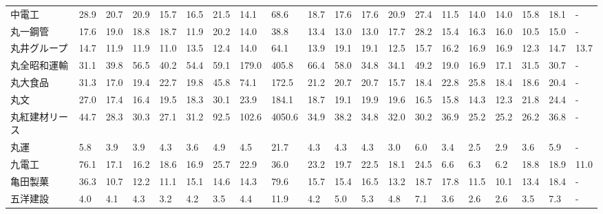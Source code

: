 \begin{tabular}{llllllllllllllllllll}
中電工             &   28.9 &   20.7 &      20.9 &      15.7 &       16.5 &    21.5 &    14.1 &     68.6 &    18.7 &    17.6 &   17.6 &   20.9 &    27.4 &    11.5 &    14.0 &   14.0 &   15.8 &    18.1 &      - \\
丸一鋼管            &   17.6 &   19.0 &      18.8 &      18.7 &       11.9 &    20.2 &    14.0 &     38.8 &    13.4 &    13.0 &   13.0 &   17.7 &    28.2 &    15.4 &    16.3 &   16.0 &   10.5 &    15.0 &      - \\
丸井グループ          &   14.7 &   11.9 &      11.9 &      11.0 &       13.5 &    12.4 &    14.0 &     64.1 &    13.9 &    19.1 &   19.1 &   12.5 &    15.7 &    16.2 &    16.9 &   16.9 &   12.3 &    14.7 &   13.7 \\
丸全昭和運輸          &   31.1 &   39.8 &      56.5 &      40.2 &       54.4 &    59.1 &   179.0 &    405.8 &    66.4 &    58.0 &   34.8 &   34.1 &    49.2 &    19.0 &    16.9 &   17.1 &   31.5 &    30.7 &      - \\
丸大食品            &   31.3 &   17.0 &      19.4 &      22.7 &       19.8 &    45.8 &    74.1 &    172.5 &    21.2 &    20.7 &   20.7 &   15.7 &    18.4 &    22.8 &    25.8 &   18.4 &   18.6 &    20.4 &      - \\
丸文              &   27.0 &   17.4 &      16.4 &      19.5 &       18.3 &    30.1 &    23.9 &    184.1 &    18.7 &    19.1 &   19.9 &   19.6 &    16.5 &    15.8 &    14.3 &   12.3 &   21.8 &    24.4 &      - \\
丸紅建材リース         &   44.7 &   28.3 &      30.3 &      27.1 &       31.2 &    92.5 &   102.6 &   4050.6 &    34.9 &    38.2 &   34.8 &   32.0 &    30.2 &    36.9 &    25.2 &   25.2 &   26.2 &    36.8 &      - \\
丸運              &    5.8 &    3.9 &       3.9 &       4.3 &        3.6 &     4.9 &     4.5 &     21.7 &     4.3 &     4.3 &    4.3 &    3.0 &     6.0 &     3.4 &     2.5 &    2.9 &    3.6 &     5.9 &      - \\
九電工             &   76.1 &   17.1 &      16.2 &      18.6 &       16.9 &    25.7 &    22.9 &     36.0 &    23.2 &    19.7 &   22.5 &   18.1 &    24.5 &     6.6 &     6.3 &    6.2 &   18.8 &    18.9 &   11.0 \\
亀田製菓            &   36.3 &   10.7 &      12.2 &      11.1 &       15.1 &    14.6 &    14.3 &     79.6 &    15.7 &    15.4 &   16.5 &   13.2 &    18.7 &    17.8 &    11.5 &   10.1 &   13.4 &    18.4 &      - \\
五洋建設            &    4.0 &    4.1 &       4.3 &       3.2 &        4.2 &     3.5 &     4.4 &     11.9 &     4.2 &     5.0 &    5.3 &    4.8 &     7.1 &     3.6 &     2.6 &    2.6 &    3.5 &     7.3 &      - \\

\end{tabular}
